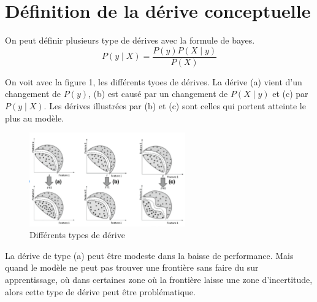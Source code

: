 \documentclass[11pt,a4paper]{report}
\date{2018}
\begin{document}
\tableofcontents

\chapter*{Définition de la dérive conceptuelle}

On peut définir plusieurs type de dérives avec la formule de bayes.
$$
P(y \mid X)=\frac{ P(y)P(X\mid y)}{P(X)}
$$
 
 On voit avec la figure 1, les différents tyoes de dérives. La dérive (a) vient d'un changement de $P(y)$, (b) est causé par un changement de $P(X\mid y)$ et (c) par $P(y \mid X)$. Les dérives illustrées par (b) et (c) sont celles qui portent atteinte le plus au modèle.

\begin{figure}[h]
\caption{Différents types de dérive}
\centering
\includegraphics[width=0.6\textwidth]{different_types_of_drift}
\end{figure}

La dérive de type (a) peut être modeste dans la baisse de performance. Mais quand le modèle ne peut pas trouver une frontière sans faire du sur apprentissage, où dans certaines zone où la frontière laisse une zone d'incertitude, alors cette type de dérive peut être problématique.
\end{document}
